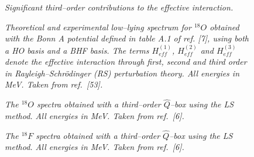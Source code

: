 \begin{figure}[hbtp]
\vspace{15cm}
\caption{{\em Significant third--order contributions to the effective interaction.}}
\label{fig:third}
\end{figure}
\clearpage
\begin{figure}[hbtp]
\vspace{15cm}
\caption{{\em Theoretical and experimental low--lying spectrum for $^{18}O$
obtained with the Bonn A potential defined in table A.1 of ref. [7], using
both a HO basis and a BHF basis. The terms $H_{eff}^{(1)}$, $H_{eff}^{(2)}$
and $H_{eff}^{(3)}$ denote the effective interaction through first, second
and third order in Rayleigh--Schr\"{o}dinger (RS) perturbation theory. All
energies in MeV. Taken from ref.\ [53]. }}
\label{fig:hobhf}
\end{figure}
\clearpage
\begin{figure}[hbtp]
\vspace{15cm}
\caption{{\em The $^{18}O$ spectra obtained with a third--order $\hat{Q}$--box
using the LS method. All energies
in MeV. Taken from ref.\ [6]. }}
\label{fig:lsconv}
\end{figure}
\clearpage
\begin{figure}[hbtp]
\vspace{15cm}
\caption{{\em The $^{18}F$ spectra obtained with a third--order $\hat{Q}$--box
using the LS method. All energies
in MeV. Taken from ref.\ [6]. }}
\label{fig:f18}
\end{figure}


